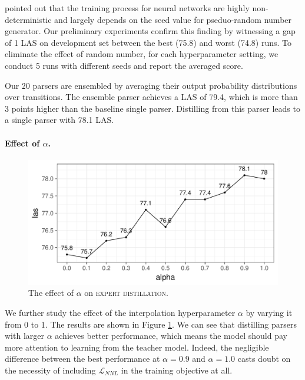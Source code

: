 \documentclass[11pt,a4paper]{article}
\newcommand{\nascomment}[1]{\textcolor{blue}{[#1 ---\textsc{nas}]}}
\begin{document}
\citet{reimers-gurevych:2017:EMNLP2017} pointed out that the training process for neural networks are highly
non-deterministic and largely depends on the seed value for pseduo-random number generator.
Our preliminary experiments confirm this finding by witnessing a gap of 1 LAS on development set
between the best (75.8) and worst (74.8) runs. To eliminate the effect of random number, for each
hyperparameter setting, we conduct 5 runs with different seeds and report the averaged score.

Our 20 parsers are ensembled by averaging their output probability
distributions over transitions. The ensemble parser achieves a LAS of 79.4, which is more 
than 3 points higher than the baseline single parser. Distilling from this
parser leads to a single parser with 78.1 LAS.

\paragraph{Effect of $\alpha$.}

\begin{figure}[t]
	\centering
	\includegraphics[width=\columnwidth,trim={0.3cm 0 0 0},clip]{graphics/alpha}
	\caption{The effect of $\alpha$ on \textsc{expert distillation}.}\label{fig:effect-alpha}
\end{figure}

We further study the effect of the interpolation hyperparameter $\alpha$ by varying it from 0 to 1.
The results are shown in Figure \ref{fig:effect-alpha}. We can see that distilling parsers with larger $\alpha$ achieves better
performance, which means the model should pay more attention to learning
from the teacher model.  Indeed, the negligible difference between the
best performance at $\alpha = 0.9$ and $\alpha=1.0$ casts doubt on the
necessity of including $\mathcal{L}_{NNL}$ in the training objective
at all.%
\end{document}
